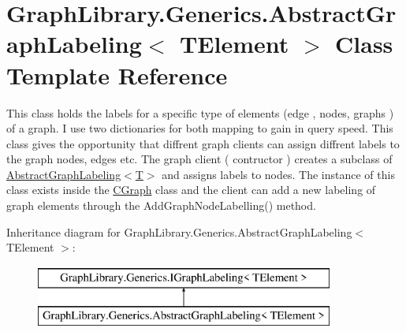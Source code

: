 \hypertarget{class_graph_library_1_1_generics_1_1_abstract_graph_labeling}{}\section{Graph\+Library.\+Generics.\+Abstract\+Graph\+Labeling$<$ T\+Element $>$ Class Template Reference}
\label{class_graph_library_1_1_generics_1_1_abstract_graph_labeling}


This class holds the labels for a specific type of elements (edge , nodes, graphs ) of a graph. I use two dictionaries for both mapping to gain in query speed. This class gives the opportunity that diffrent graph clients can assign diffrent labels to the graph nodes, edges etc. The graph client ( contructor ) creates a subclass of \hyperlink{class_graph_library_1_1_generics_1_1_abstract_graph_labeling}{Abstract\+Graph\+Labeling$<$\+T$>$} and assigns labels to nodes. The instance of this class exists inside the \hyperlink{class_graph_library_1_1_c_graph}{C\+Graph} class and the client can add a new labeling of graph elements through the Add\+Graph\+Node\+Labelling() method.  


Inheritance diagram for Graph\+Library.\+Generics.\+Abstract\+Graph\+Labeling$<$ T\+Element $>$\+:\begin{figure}[H]
\begin{center}
\leavevmode
\includegraphics[height=2.000000cm]{class_graph_library_1_1_generics_1_1_abstract_graph_labeling}
\end{center}
\end{figure}
